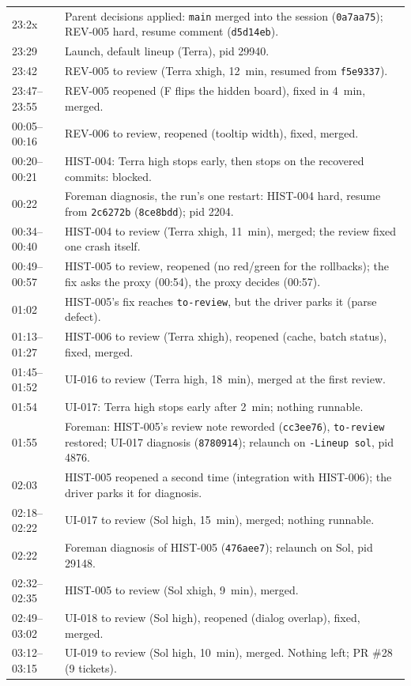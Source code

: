 \documentclass[11pt,a4paper]{article}
\begin{document}
{\small
\begin{tabularx}{\linewidth}{@{}lX@{}}
\toprule
23:2x & Parent decisions applied: \texttt{main} merged into the session (\texttt{0a7aa75}); REV-005 hard, resume comment (\texttt{d5d14eb}). \\
23:29 & Launch, default lineup (Terra), pid 29940. \\
23:42 & REV-005 to review (Terra xhigh, 12~min, resumed from \texttt{f5e9337}). \\
23:47--23:55 & REV-005 reopened (F flips the hidden board), fixed in 4~min, merged. \\
00:05--00:16 & REV-006 to review, reopened (tooltip width), fixed, merged. \\
00:20--00:21 & HIST-004: Terra high stops early, then stops on the recovered commits: blocked. \\
00:22 & Foreman diagnosis, the run's one restart: HIST-004 hard, resume from \texttt{2c6272b} (\texttt{8ce8bdd}); pid 2204. \\
00:34--00:40 & HIST-004 to review (Terra xhigh, 11~min), merged; the review fixed one crash itself. \\
00:49--00:57 & HIST-005 to review, reopened (no red/green for the rollbacks); the fix asks the proxy (00:54), the proxy decides (00:57). \\
01:02 & HIST-005's fix reaches \texttt{to-review}, but the driver parks it (parse defect). \\
01:13--01:27 & HIST-006 to review (Terra xhigh), reopened (cache, batch status), fixed, merged. \\
01:45--01:52 & UI-016 to review (Terra high, 18~min), merged at the first review. \\
01:54 & UI-017: Terra high stops early after 2~min; nothing runnable. \\
01:55 & Foreman: HIST-005's review note reworded (\texttt{cc3ee76}), \texttt{to-review} restored; UI-017 diagnosis (\texttt{8780914}); relaunch on \texttt{-Lineup sol}, pid 4876. \\
02:03 & HIST-005 reopened a second time (integration with HIST-006); the driver parks it for diagnosis. \\
02:18--02:22 & UI-017 to review (Sol high, 15~min), merged; nothing runnable. \\
02:22 & Foreman diagnosis of HIST-005 (\texttt{476aee7}); relaunch on Sol, pid 29148. \\
02:32--02:35 & HIST-005 to review (Sol xhigh, 9~min), merged. \\
02:49--03:02 & UI-018 to review (Sol high), reopened (dialog overlap), fixed, merged. \\
03:12--03:15 & UI-019 to review (Sol high, 10~min), merged. Nothing left; PR \#28 (9 tickets). \\
\bottomrule
\end{tabularx}
}
\end{document}
